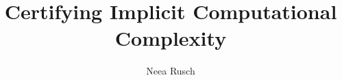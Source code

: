 \documentclass[letterpaper,11pt]{article}
\title{Certifying Implicit Computational Complexity}
\author{Neea Rusch}
\begin{document}
    \nolinenumbers
    
    
    
    
    
    
    \linenumbers
    
    
    
    
    
    
    \nolinenumbers
    
\end{document}
